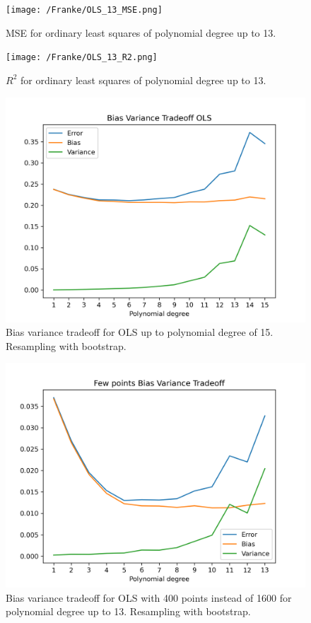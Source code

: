 \documentclass{article}
\begin{document}
\begin{figure}[htbp]
    \centering
    \texttt{[image: /Franke/OLS\_13\_MSE.png]}
    \caption{MSE for ordinary least squares of polynomial degree up to 13.}
    \label{fig:OLS5MSE}
\end{figure}

\begin{figure}[htbp]
    \centering
    \texttt{[image: /Franke/OLS\_13\_R2.png]}
    \caption{$R^2$ for ordinary least squares of polynomial degree up to 13.}
    \label{fig:OLS5R2}
\end{figure}

\begin{figure}[htbp]
    \centering
    \includegraphics[width=\textwidth*2/3]{Project1/figures/Franke/Bias_Variance_Tradeoff_OLS_15.png}
    \caption{Bias variance tradeoff for OLS up to polynomial degree of 15. Resampling with bootstrap.}
    \label{fig:BVtradeoff}
\end{figure}

\begin{figure}[htbp]
    \centering
    \includegraphics[width=\textwidth*2/3]{Project1/figures/Franke/Few_points_Bias_Variance_Tradeoff_13.png}
    \caption{Bias variance tradeoff for OLS with 400 points instead of 1600 for polynomial degree up to 13. Resampling with bootstrap.}
    \label{fig:FewBVtradeoff}
\end{figure}
\end{document}

